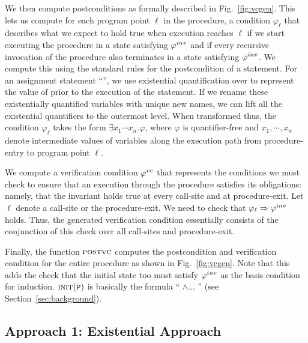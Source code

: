 We then compute postconditions as formally described in Fig.~\ref{fig:vcgen}.
This lets us compute for each program point $\ell$ in the procedure,
a condition $\varphi_{\ell}$ that describes what we expect to hold true when execution reaches $\ell$ if we start
executing the procedure in a state satisfying $\varphi^{inv}$ and if every recursive invocation of the procedure also
terminates in a state satisfying $\varphi^{inv}$. We compute this using the standard rules for the postcondition of a statement.
%
For an assignment statement ``'', we use existential quantification over  to represent the value
of  prior to the execution of the statement. If we rename these existentially quantified variables with unique new
names, we can lift all the existential quantifiers to the outermost level. When transformed thus, the condition $\varphi_{\ell}$
takes the form $\exists x_1 \cdots x_n. \varphi$, where $\varphi$ is quantifier-free and $x_1, \cdots, x_n$ denote
intermediate values of variables along the execution path from procedure-entry to program point $\ell$.

We compute a verification condition $\varphi^{vc}$ that represents the conditions we must check to ensure that
an execution through the procedure satisfies its obligations: namely, that the invariant holds true at every call-site
and at procedure-exit. Let $\ell$ denote a call-site or the procedure-exit. We need to check that $\varphi_{\ell} \Rightarrow \varphi^{inv}$
holds. Thus, the generated verification condition essentially consists of the conjunction of this check over all call-sites
and procedure-exit.

Finally, the function $\textsc{postvc}$ computes the postcondition and verification condition for the entire procedure as shown
in Fig.~\ref{fig:vcgen}. Note that this adds the check that the initial state too must satisfy $\varphi^{inv}$ as the basis condition for
induction. $\textsc{init}(\textsc{p})$ is basically the formula  ``
$\wedge \ldots$ '' (see Section~\ref{sec:background}).



\subsection{Approach 1: Existential Approach}

